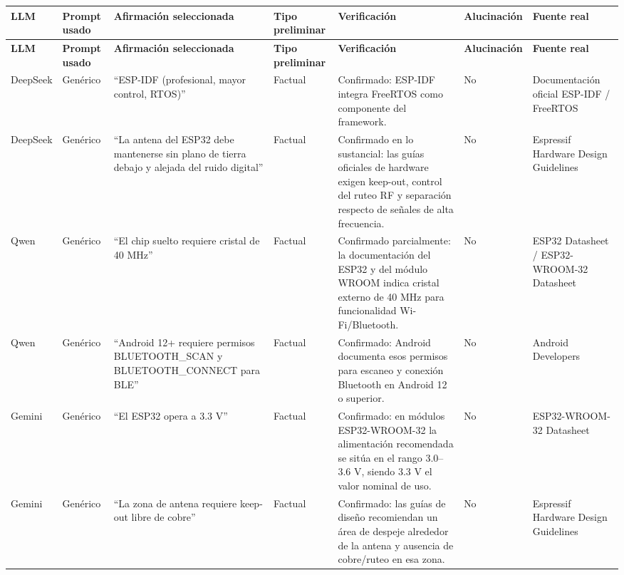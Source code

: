 \documentclass[11pt,a4paper]{article}
\begin{document}
\begin{landscape}
\setlength{\LTleft}{0pt}
\setlength{\LTright}{0pt}
\scriptsize
\setlength{\tabcolsep}{3pt}
\renewcommand{\arraystretch}{1.06}
\begin{longtable}{|P{2.2cm}|P{1.8cm}|P{5.7cm}|P{2.2cm}|P{5.3cm}|P{2.0cm}|P{3.9cm}|}
\hline
\textbf{LLM} & \textbf{Prompt usado} & \textbf{Afirmación seleccionada} & \textbf{Tipo preliminar} & \textbf{Verificación} & \textbf{Alucinación} & \textbf{Fuente real} \\
\hline
\endfirsthead

\hline
\textbf{LLM} & \textbf{Prompt usado} & \textbf{Afirmación seleccionada} & \textbf{Tipo preliminar} & \textbf{Verificación} & \textbf{Alucinación} & \textbf{Fuente real} \\
\hline
\endhead

DeepSeek & Genérico & ``ESP-IDF (profesional, mayor control, RTOS)'' & Factual & Confirmado: ESP-IDF integra FreeRTOS como componente del framework. & No & Documentación oficial ESP-IDF / FreeRTOS \\
\hline

DeepSeek & Genérico & ``La antena del ESP32 debe mantenerse sin plano de tierra debajo y alejada del ruido digital'' & Factual & Confirmado en lo sustancial: las guías oficiales de hardware exigen keep-out, control del ruteo RF y separación respecto de señales de alta frecuencia. & No & Espressif Hardware Design Guidelines \\
\hline

Qwen & Genérico & ``El chip suelto requiere cristal de 40 MHz'' & Factual & Confirmado parcialmente: la documentación del ESP32 y del módulo WROOM indica cristal externo de 40 MHz para funcionalidad Wi-Fi/Bluetooth. & No & ESP32 Datasheet / ESP32-WROOM-32 Datasheet \\
\hline

Qwen & Genérico & ``Android 12+ requiere permisos BLUETOOTH\_SCAN y BLUETOOTH\_CONNECT para BLE'' & Factual & Confirmado: Android documenta esos permisos para escaneo y conexión Bluetooth en Android 12 o superior. & No & Android Developers \\
\hline

Gemini & Genérico & ``El ESP32 opera a 3.3 V'' & Factual & Confirmado: en módulos ESP32-WROOM-32 la alimentación recomendada se sitúa en el rango 3.0--3.6 V, siendo 3.3 V el valor nominal de uso. & No & ESP32-WROOM-32 Datasheet \\
\hline

Gemini & Genérico & ``La zona de antena requiere keep-out libre de cobre'' & Factual & Confirmado: las guías de diseño recomiendan un área de despeje alrededor de la antena y ausencia de cobre/ruteo en esa zona. & No & Espressif Hardware Design Guidelines \\
\hline


\end{longtable}
\end{landscape}
\end{document}
